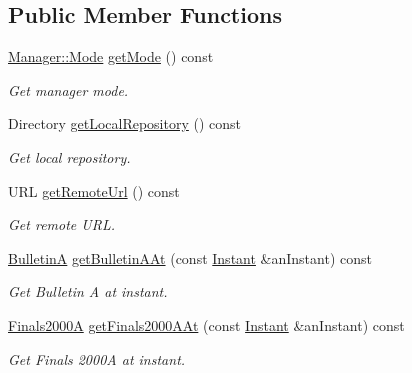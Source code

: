 \subsection*{Public Member Functions}
\begin{DoxyCompactItemize}
\item 
\hyperlink{classostk_1_1physics_1_1coord_1_1frame_1_1provider_1_1iers_1_1_manager_a3a8dd1081d1094069417687b4a3f16ba}{Manager\+::\+Mode} \hyperlink{classostk_1_1physics_1_1coord_1_1frame_1_1provider_1_1iers_1_1_manager_a00d80d91459b7d0fdac3c2dfed99d447}{get\+Mode} () const
\begin{DoxyCompactList}\small\item\em Get manager mode. \end{DoxyCompactList}\item 
Directory \hyperlink{classostk_1_1physics_1_1coord_1_1frame_1_1provider_1_1iers_1_1_manager_a0319940b293dd137109918ccbb54066a}{get\+Local\+Repository} () const
\begin{DoxyCompactList}\small\item\em Get local repository. \end{DoxyCompactList}\item 
U\+RL \hyperlink{classostk_1_1physics_1_1coord_1_1frame_1_1provider_1_1iers_1_1_manager_aee0fdfd01bea7d3cb6edf90d25536ca0}{get\+Remote\+Url} () const
\begin{DoxyCompactList}\small\item\em Get remote U\+RL. \end{DoxyCompactList}\item 
\hyperlink{classostk_1_1physics_1_1coord_1_1frame_1_1provider_1_1iers_1_1_bulletin_a}{BulletinA} \hyperlink{classostk_1_1physics_1_1coord_1_1frame_1_1provider_1_1iers_1_1_manager_a50eef4d573db5ad33f6ce7ee13749ad9}{get\+Bulletin\+A\+At} (const \hyperlink{classostk_1_1physics_1_1time_1_1_instant}{Instant} \&an\+Instant) const
\begin{DoxyCompactList}\small\item\em Get Bulletin A at instant. \end{DoxyCompactList}\item 
\hyperlink{classostk_1_1physics_1_1coord_1_1frame_1_1provider_1_1iers_1_1_finals2000_a}{Finals2000A} \hyperlink{classostk_1_1physics_1_1coord_1_1frame_1_1provider_1_1iers_1_1_manager_a57081be2537ed82f94729c5954d2c28d}{get\+Finals2000\+A\+At} (const \hyperlink{classostk_1_1physics_1_1time_1_1_instant}{Instant} \&an\+Instant) const
\begin{DoxyCompactList}\small\item\em Get Finals 2000A at instant. \end{DoxyCompactList}\item 

\end{DoxyCompactItemize}
